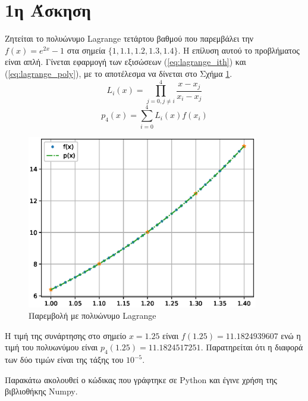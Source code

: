 \documentclass[assignment3.tex]{subfiles}
\begin{document}
\section*{1η Άσκηση}
Ζητείται το πολυώνυμο \textlatin{Lagrange} τετάρτου βαθμού που παρεμβάλει την $f(x)=e^{2x}-1$ στα σημεία $\lbrace1, 1.1, 1.2, 1.3,1.4\rbrace$. Η επίλυση αυτού το προβλήματος είναι απλή. Γίνεται εφαρμογή των εξισώσεων (\ref{eq:lagrange_ith}) και (\ref{eq:lagrange_poly}), με το αποτέλεσμα να δίνεται στο Σχήμα \ref{fig:ex1}.
\begin{equation}
L_i(x) = \prod_{j=0, j\neq i}^{4}\frac{x-x_j}{x_i-x_j}
\label{eq:lagrange_ith}
\end{equation}
\begin{equation}
p_4(x) = \sum_{i=0}^{4}L_i(x)f(x_i)
\label{eq:lagrange_poly}
\end{equation}
\begin{figure}[hp]
\includegraphics[width=0.9\textwidth]{ex1.eps}
\centering
\caption{Παρεμβολή με πολυώνυμο \textlatin{Lagrange}}
\label{fig:ex1}
\end{figure}
Η τιμή της συνάρτησης στο σημείο $x=1.25$ είναι $f(1.25)=11.1824939607$ ενώ η τιμή του πολυωνύμου είναι $p_4(1.25)=11.1824517251$. Παρατηρείται ότι η διαφορά των δύο τιμών είναι της τάξης του $10^{-5}$.

Παρακάτω ακολουθεί ο κώδικας που γράφτηκε σε \textlatin{Python} και έγινε χρήση της βιβλιοθήκης \textlatin{Numpy}.

\end{document}
